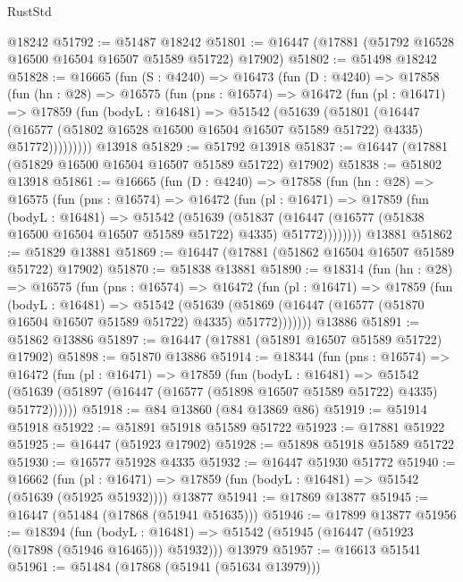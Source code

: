 \begin{lexlean}{RustStd}
\begin{coremodule}
    @18242
@51792 := @51487 @18242
@51801 := @16447 (@17881 (@51792 @16528 @16500 @16504 @16507 @51589 @51722) @17902)
@51802 := @51498 @18242
@51828 := @16665
    (fun (S : @4240) =>
    @16473
      (fun (D : @4240) =>
      @17858
        (fun (hn : @28) =>
        @16575
          (fun (pns : @16574) =>
          @16472
            (fun (pl : @16471) =>
            @17859
              (fun (bodyL : @16481) =>
              @51542
                (@51639
                  (@51801
                    (@16447
                      (@16577 (@51802 @16528 @16500 @16504 @16507 @51589 @51722) @4335)
                      @51772)))))))))
    @13918
@51829 := @51792 @13918
@51837 := @16447 (@17881 (@51829 @16500 @16504 @16507 @51589 @51722) @17902)
@51838 := @51802 @13918
@51861 := @16665
    (fun (D : @4240) =>
    @17858
      (fun (hn : @28) =>
      @16575
        (fun (pns : @16574) =>
        @16472
          (fun (pl : @16471) =>
          @17859
            (fun (bodyL : @16481) =>
            @51542
              (@51639
                (@51837
                  (@16447 (@16577 (@51838 @16500 @16504 @16507 @51589 @51722) @4335) @51772))))))))
    @13881
@51862 := @51829 @13881
@51869 := @16447 (@17881 (@51862 @16504 @16507 @51589 @51722) @17902)
@51870 := @51838 @13881
@51890 := @18314
    (fun (hn : @28) =>
    @16575
      (fun (pns : @16574) =>
      @16472
        (fun (pl : @16471) =>
        @17859
          (fun (bodyL : @16481) =>
          @51542
            (@51639
              (@51869 (@16447 (@16577 (@51870 @16504 @16507 @51589 @51722) @4335) @51772)))))))
    @13886
@51891 := @51862 @13886
@51897 := @16447 (@17881 (@51891 @16507 @51589 @51722) @17902)
@51898 := @51870 @13886
@51914 := @18344
    (fun (pns : @16574) =>
    @16472
      (fun (pl : @16471) =>
      @17859
        (fun (bodyL : @16481) =>
        @51542 (@51639 (@51897 (@16447 (@16577 (@51898 @16507 @51589 @51722) @4335) @51772))))))
@51918 := @84 @13860 (@84 @13869 @86)
@51919 := @51914 @51918
@51922 := @51891 @51918 @51589 @51722
@51923 := @17881 @51922
@51925 := @16447 (@51923 @17902)
@51928 := @51898 @51918 @51589 @51722
@51930 := @16577 @51928 @4335
@51932 := @16447 @51930 @51772
@51940 := @16662
    (fun (pl : @16471) => @17859 (fun (bodyL : @16481) => @51542 (@51639 (@51925 @51932))))
    @13877
@51941 := @17869 @13877
@51945 := @16447 (@51484 (@17868 (@51941 @51635)))
@51946 := @17899 @13877
@51956 := @18394
    (fun (bodyL : @16481) => @51542 (@51945 (@16447 (@51923 (@17898 (@51946 @16465))) @51932)))
    @13979
@51957 := @16613 @51541
@51961 := @51484 (@17868 (@51941 (@51634 @13979)))

\end{coremodule}
\end{lexlean}
